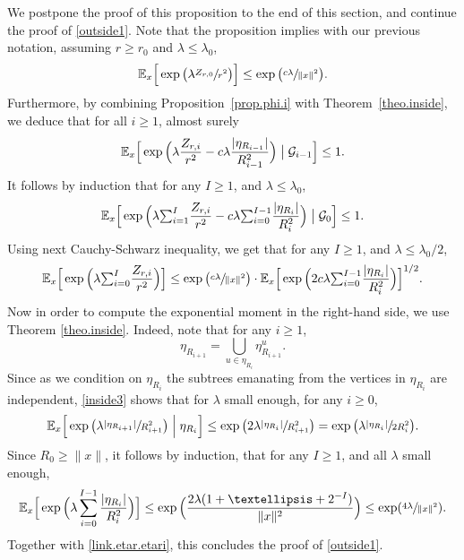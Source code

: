 \documentclass[11pt]{article}
\numberwithin{equation}{section}
\let\ts\textstyle
\theoremstyle{plain}
\theoremstyle{definition}
\newcommand{\1}{{\text{\Large $\mathfrak 1$}}}
\begin{document}
We postpone the proof of this proposition to the end of this section, and continue the proof of \eqref{outside1}.
Note that the proposition implies with our previous notation, assuming $r\ge r_0$ and $\lambda\le \lambda_0$,
\begin{equation*}
\mathbb E_x\Big[\exp\big(\lambda\sfrac{Z_{r,0}}{r^2}\big)\Big] \le \exp\big(\sfrac{c\lambda}{\|x\|^2}\big).
\end{equation*}
Furthermore, by combining Proposition~\ref{prop.phi.i} with Theorem~\ref{theo.inside}, we deduce that for all $i\ge 1$,
almost surely
\begin{equation*}
\mathbb E_x\Big[\exp\Big(\lambda\frac{Z_{r,i}}{r^2}
- c\lambda\frac{ |\eta_{R_{i-1}}|}{R_{i-1}^2}\Big)\bigm| \mathcal G_{i-1}\Big] \le 1.
\end{equation*}
It follows by induction that for any $I\ge 1$, and $\lambda\le \lambda_0$,
\[
\mathbb E_x\Big[\exp\Big(\lambda{\ts\sum_{i=1}^I} \frac{ Z_{r,i}}{r^2}
-c\lambda {\ts\sum_{i=0}^{I-1}}\frac{ |\eta_{R_i}|}{R_i^2}\Big)
\bigm| \mathcal G_0
\Big] \le 1.
\]
Using next Cauchy-Schwarz inequality, we get that for any $I\ge 1$, and $\lambda\le \lambda_0/2$,
\[
\mathbb E_x\Big[\exp\Big(\lambda {\ts\sum_{i=0}^I}
\frac{ Z_{r,i}}{r^2} \Big)\Big]
\le \exp\big(\sfrac{c\lambda}{\|x\|^2}\big) \cdot
\mathbb E_x\Big[\exp\Big(2c\lambda {\ts\sum_{i=0}^{I-1}}
\frac{ |\eta_{R_i}|}{R_i^2}\Big)\Big]^{1/2}.
\]
Now in order to compute the exponential moment in the right-hand side,
we use Theorem \ref{theo.inside}. Indeed, note that for any $i\ge 1$,
\begin{equation*}
\eta_{R_{i+1}} = \bigcup_{u\in \eta_{R_i}}
\eta^u_{R_{i+1}}.
\end{equation*}
Since as we condition on $ \eta_{R_i}$ the subtrees emanating from the vertices in
$\eta_{R_i}$ are independent,
\eqref{inside3} shows that for $\lambda$ small enough, for any $i\ge 0$,
\begin{equation*}
\mathbb E_x\Big[\exp\big(\lambda \sfrac{ |\eta_{R_{i+1}}|}{R_{i+1}^2}\big)
\Bigm|\eta_{R_i}\Big]
\le \exp\big(2\lambda \sfrac{ |\eta_{R_i}|}{R_{i+1}^2}\big)
= \exp\big(\lambda \sfrac{ |\eta_{R_i}|}{2R_i^2}\big).
\end{equation*}
Since $R_0\ge \|x\|$, it follows by induction, that
for any $I\ge 1$, and all $\lambda$ small enough,
\begin{equation*}
\mathbb E_x\Big[\exp\Big(\lambda \sum_{i=0}^{I-1}
\frac{ |\eta_{R_i}|}{R_i^2}\Big)\Big]
\le \exp\Big(\frac{2\lambda(1+\dots+2^{-I})}{\|x\|^2}\Big)
\le \exp(\sfrac{4\lambda}{\|x\|^2}).
\end{equation*}
Together with \eqref{link.etar.etari}, this concludes the proof of \eqref{outside1}.
\end{document}
